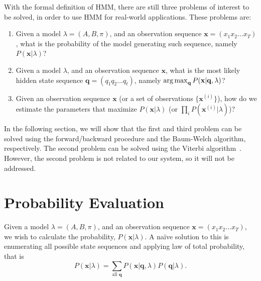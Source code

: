 \documentclass[12pt,final,twoside]{report}
\begin{document}
With the formal definition of HMM, there are still three problems of interest to be solved, in order to use HMM for real-world applications. These problems are:
\begin{enumerate}
  \item Given a model $\lambda=(A, B, \pi)$, and an observation sequence $\mathbf{x} = (x_1 x_2 \dots x_T)$, what is the probability of the model generating such sequence, namely $P(\mathbf{x}|\lambda)$?
  \item Given a model $\lambda$, and an observation sequence $\mathbf{x}$, what is the most likely hidden state sequence $\mathbf{q} = (q_1 q_2 \dots q_t)$, namely $\operatorname*{arg\,max}_{\mathbf{q}}P(\mathbf{x}|\mathbf{q},\lambda)$?
  \item Given an observation sequence $\mathbf{x}$ (or a set of observations $\{\mathbf{x}^{(i)}\}$), how do we estimate the parameters that maximize $P(\mathbf{x}|\lambda)$ (or $\prod_{i} P(\mathbf{x}^{(i)}|\lambda) $)?
\end{enumerate}

In the following section, we will show that the first and third problem can be solved using the forward/backward procedure and the Baum-Welch algorithm, respectively. The second problem can be solved using the Viterbi algorithm~\cite{forney_viterbi_1973}. However, the second problem is not related to our system, so it will not be addressed.

\section{Probability Evaluation}
Given a model $\lambda=(A, B, \pi)$, and an observation sequence $\mathbf{x} = (x_1 x_2 \dots x_T)$, we wish to calculate the probability, $P(\mathbf{x}|\lambda)$. A na\"ive solution to this is enumerating all possible state sequences and applying law of total probability, that is
\begin{equation}
  P(\mathbf{x}|\lambda) = \sum_{\text{all } \mathbf{q}} P(\mathbf{x}|\mathbf{q},\lambda) P(\mathbf{q}|\lambda) .
\end{equation}
\end{document}
